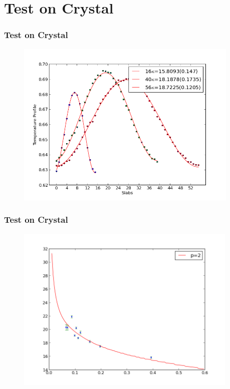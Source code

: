 \documentclass{beamer}
\begin{document}
\section{Test on Crystal}
\begin{frame}
\frametitle{Test on Crystal}
\begin{figure}
    \centering
    \includegraphics[height=8cm]{Experiments.png}
\end{figure}
\end{frame}
\begin{frame}
\frametitle{Test on Crystal}
\begin{figure}
    \centering
    \includegraphics[height=8cm]{ConEx.png}
\end{figure}
\end{frame}

\end{document}
